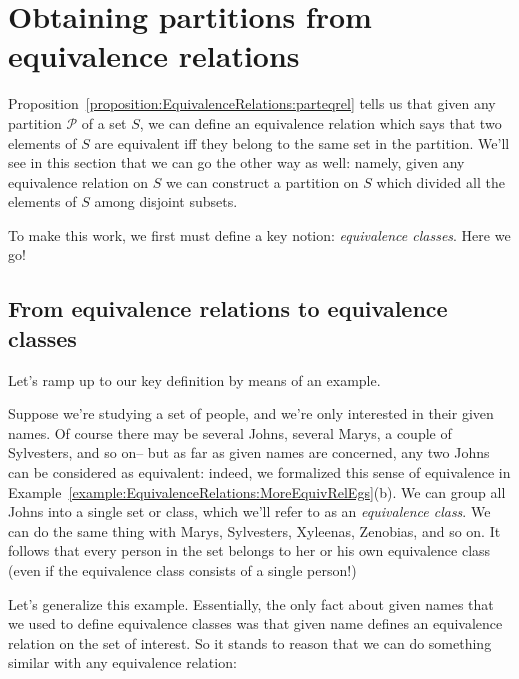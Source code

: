 \section{Obtaining partitions from equivalence relations\quad{}} \label{sec:EquivalenceRelations:ObtainingPartitions}

Proposition~\ref{proposition:EquivalenceRelations:parteqrel} tells us that given any partition $\mathcal{P}$ of a set $S$, we can define an equivalence relation which says that two elements of $S$ are equivalent iff they belong to the same set in the partition. We'll see in this section that we can go the other way as well: namely, given any equivalence relation on $S$ we can construct a partition on $S$ which divided all the elements of $S$ among disjoint subsets.

To make this work, we first must define a key notion: \emph{equivalence classes}. Here we go!

\subsection{From equivalence relations to equivalence classes}
\label{subsec:EquivalenceRelations:ObtainingPartitions:RelationToClass}

Let's ramp up to our key definition by means of  an example. 

\begin{example}{}
Suppose we're studying a set of people, and we're only interested in their given names.  Of course there may be several Johns, several Marys, a couple of Sylvesters, and so on-- but  as far as given names are concerned, any two Johns can be considered as equivalent: indeed, we formalized this sense of equivalence in Example~\ref{example:EquivalenceRelations:MoreEquivRelEgs}(b). We can group all Johns into a single set or class, which we'll refer to as an  \emph{equivalence class}. We can do the same thing with Marys, Sylvesters, Xyleenas, Zenobias, and so on. It follows that every person in the set belongs to her or his own equivalence class (even if the equivalence class consists of a single person!)
\end{example}

Let's generalize this example. Essentially, the only fact about given names that we used to define equivalence classes was that given name defines an equivalence relation on the set of interest. So it stands to reason that we can do something similar with any equivalence relation:
 
